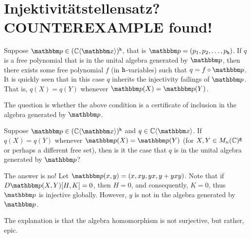 


\section{Injektivit{\"a}tstellensatz? COUNTEREXAMPLE found!}

Suppose $\bbp\in (\C\fralg{\bbx})^\tth$, that is $\bbp = (p_1,p_2,\dots, p_\tth)$.
If $q$ is a free polynomial that is in the unital algebra generated by $\bbp$, then there exists some free polynomial $f$ (in 
${\texttt{h}}$-variables) such that $q = f\circ \bbp$.
It is quickly seen that in this case $q$ inherits the injectivity failings of $\bbp$.
That is, $q(X) = q(Y)$ whenever $\bbp(X) = \bbp(Y)$.

The question is whether the above condition is a certificate of inclusion in the algebra generated by $\bbp$.

\begin{problem}
	Suppose $\bbp\in (\C\fralg{\bbx})^\tth$ and $q\in \C\fralg{\bbx}$.
	If $q(X) = q(Y)$ whenever $\bbp(X) = \bbp(Y)$ (for $X,Y\in M_n(\mathbb{C})^{\texttt{g}}$ or perhaps a different free set), then is it the case that $q$ 
	is in the unital algebra generated by $\bbp$?
\end{problem}

The answer is no! Let $\bbp(x,y) = (x, xy, yx, y + yxy)$.
Note that if $D\bbp(X,Y)[H,K] = 0$, then $H = 0$, and consequently, $K=0$, thus $\bbp$ is injective globally.
However, $y$ is not in the algebra generated by $\bbp$.

The explanation is that the algebra homomorphism is not surjective, but rather, epic.


%
%

%


